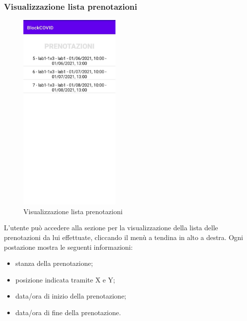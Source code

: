 \subsubsection{Visualizzazione lista prenotazioni}
\begin{figure}[H]
	\centering
	\includegraphics[width=5cm]{res/images/VisualizzaPrenotazioni.png}
	\caption{Visualizzazione lista prenotazioni}
\end{figure}
L’utente può accedere alla sezione per la visualizzazione della lista delle prenotazioni da lui effettuate, cliccando il menù a tendina in alto a destra.
Ogni postazione mostra le seguenti informazioni:
\begin{itemize}
	\item stanza della prenotazione;
	\item posizione indicata tramite X e Y;
	\item data/ora di inizio della prenotazione;
	\item data/ora di fine della prenotazione.
\end{itemize}
